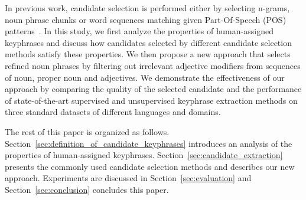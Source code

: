 
  In previous work, candidate selection is performed either by selecting n-grams, noun phrase chunks or word sequences matching given Part-Of-Speech (POS) patterns~\cite{hulth2003keywordextraction}.
  In this study, we first analyze the properties of human-assigned keyphrases and discuss how candidates selected by different candidate selection methods satisfy these properties.
  We then propose a new approach that selects refined noun phrases by filtering out irrelevant adjective modifiers from sequences of noun, proper noun and adjectives.
  We demonstrate the effectiveness of our approach by comparing the quality of the selected candidate and the performance of state-of-the-art supervised and unsupervised keyphrase extraction methods on three standard datasets of different languages and domains.

  The rest of this paper is organized as follows.
  Section~\ref{sec:definition_of_candidate_keyphrases} introduces an analysis of the properties of human-assigned keyphrases.
  Section~\ref{sec:candidate_extraction} presents the commonly used candidate selection methods and describes our new approach.
  Experiments are discussed in Section~\ref{sec:evaluation} and Section~\ref{sec:conclusion} concludes this paper.


